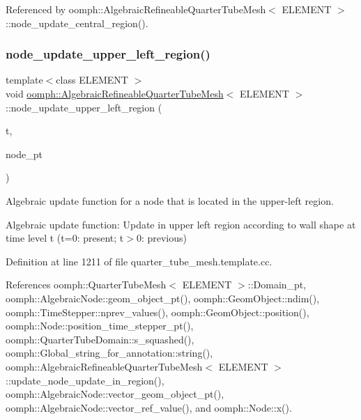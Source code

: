 Referenced by oomph\+::\+Algebraic\+Refineable\+Quarter\+Tube\+Mesh$<$ E\+L\+E\+M\+E\+N\+T $>$\+::node\+\_\+update\+\_\+central\+\_\+region().

\mbox{\label{classoomph_1_1AlgebraicRefineableQuarterTubeMesh_ac82a39ccaed8016a9b1e841d91658a75}} 
\subsubsection{\texorpdfstring{node\+\_\+update\+\_\+upper\+\_\+left\+\_\+region()}{node\_update\_upper\_left\_region()}}
{\footnotesize\ttfamily template$<$class E\+L\+E\+M\+E\+NT $>$ \\
void \hyperlink{classoomph_1_1AlgebraicRefineableQuarterTubeMesh}{oomph\+::\+Algebraic\+Refineable\+Quarter\+Tube\+Mesh}$<$ E\+L\+E\+M\+E\+NT $>$\+::node\+\_\+update\+\_\+upper\+\_\+left\+\_\+region (\begin{DoxyParamCaption}\item[{const unsigned \&}]{t,  }\item[{\hyperlink{classoomph_1_1AlgebraicNode}{Algebraic\+Node} $\ast$\&}]{node\+\_\+pt }\end{DoxyParamCaption})\hspace{0.3cm}{\ttfamily [private]}}



Algebraic update function for a node that is located in the upper-\/left region. 

Algebraic update function\+: Update in upper left region according to wall shape at time level t (t=0\+: present; t$>$0\+: previous) 

Definition at line 1211 of file quarter\+\_\+tube\+\_\+mesh.\+template.\+cc.



References oomph\+::\+Quarter\+Tube\+Mesh$<$ E\+L\+E\+M\+E\+N\+T $>$\+::\+Domain\+\_\+pt, oomph\+::\+Algebraic\+Node\+::geom\+\_\+object\+\_\+pt(), oomph\+::\+Geom\+Object\+::ndim(), oomph\+::\+Time\+Stepper\+::nprev\+\_\+values(), oomph\+::\+Geom\+Object\+::position(), oomph\+::\+Node\+::position\+\_\+time\+\_\+stepper\+\_\+pt(), oomph\+::\+Quarter\+Tube\+Domain\+::s\+\_\+squashed(), oomph\+::\+Global\+\_\+string\+\_\+for\+\_\+annotation\+::string(), oomph\+::\+Algebraic\+Refineable\+Quarter\+Tube\+Mesh$<$ E\+L\+E\+M\+E\+N\+T $>$\+::update\+\_\+node\+\_\+update\+\_\+in\+\_\+region(), oomph\+::\+Algebraic\+Node\+::vector\+\_\+geom\+\_\+object\+\_\+pt(), oomph\+::\+Algebraic\+Node\+::vector\+\_\+ref\+\_\+value(), and oomph\+::\+Node\+::x().



